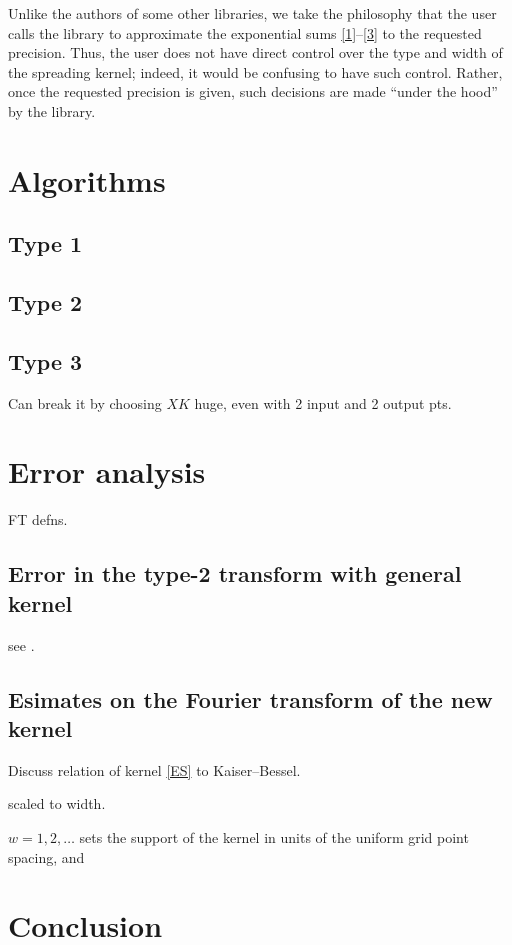 \documentclass[10pt]{article}
\newcommand{\KB}{Kaiser--Bessel}
\begin{document}
Unlike the authors of some other libraries,
we take the philosophy that the user calls the library to approximate the
exponential sums \eqref{1}--\eqref{3} to the requested precision.
Thus, the user does not have direct control over the type and width of
the spreading kernel; indeed, it would be confusing to have such control.
Rather, once the requested precision is given, such decisions
are made ``under the hood'' by the library.


\section{Algorithms}

\subsection{Type 1}

\subsection{Type 2}


\subsection{Type 3}

Can break it by choosing $XK$ huge, even with 2 input and 2 output pts.




\section{Error analysis}

FT defns.

\subsection{Error in the type-2 transform with general kernel}

see \cite[Sec.~V.B]{fessler}.




\subsection{Esimates on the Fourier transform of the new kernel}

Discuss relation of kernel \eqref{ES} to \KB.



scaled to width.

$w=1,2,\ldots$
sets the support of the kernel in units of the uniform grid point spacing, and





\section{Conclusion}




\end{document}

